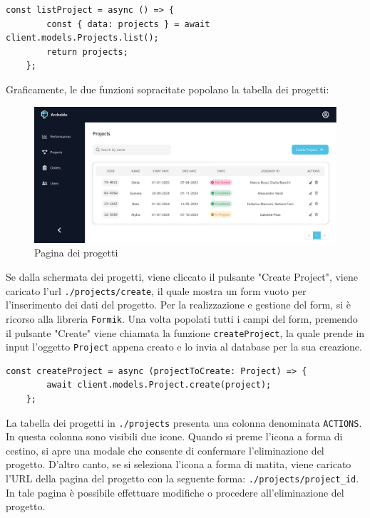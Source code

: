 \documentclass[target=bach,aauheader=,style=]{thud}
\begin{document}
\begin{lstlisting}[caption=funzione \texttt{listProject}]
    const listProject = async () => {
        const { data: projects } = await client.models.Projects.list();
        return projects;
    };
\end{lstlisting}
Graficamente, le due funzioni sopracitate popolano la tabella dei progetti:

\begin{figure}[H]
    \centering
    \includegraphics[width=1\textwidth]{img/interfacce/table_project.pdf} 
    \caption{Pagina dei progetti}
\end{figure}
\noindent Se dalla schermata dei progetti, viene cliccato il pulsante "Create Project", viene caricato l'url \texttt{./projects/create}, il quale mostra un form vuoto per l'inserimento dei dati del progetto. Per la realizzazione e gestione del form, si è ricorso alla libreria \texttt{Formik}. Una volta popolati tutti i campi del form, premendo il pulsante "Create" viene chiamata la funzione \texttt{createProject}, la quale prende in input l'oggetto \texttt{Project} appena creato e lo invia al database per la sua creazione.

\begin{lstlisting}[caption=funzione \texttt{createProject}]
    const createProject = async (projectToCreate: Project) => {
        await client.models.Project.create(project);
    };
\end{lstlisting}

\noindent La tabella dei progetti in \texttt{./projects} presenta una colonna denominata \texttt{ACTIONS}. In questa colonna sono visibili due icone. Quando si preme l'icona a forma di cestino, si apre una modale che consente di confermare l'eliminazione del progetto. D'altro canto, se si seleziona l'icona a forma di matita, viene caricato l'URL della pagina del progetto con la seguente forma: \texttt{./projects/project\_id}. In tale pagina è possibile effettuare modifiche o procedere all'eliminazione del progetto.
\end{document}
